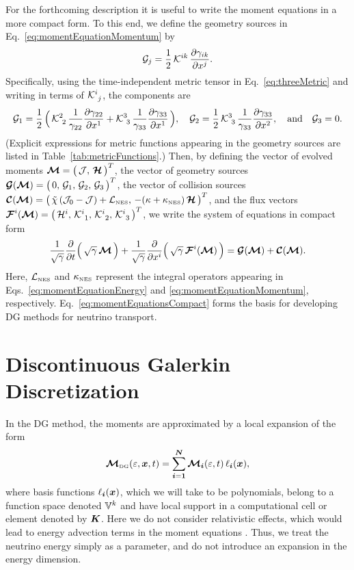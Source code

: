 \documentclass[10pt,preprint]{aastex}
\newcommand{\NES}{\mbox{\tiny NES}}
\begin{document}
For the forthcoming description it is useful to write the moment equations in a more compact form.  
To this end, we define the geometry sources in Eq.~\eqref{eq:momentEquationMomentum} by
\begin{equation}
  \mathcal{G}_{j}
  =\frac{1}{2}\,\mathcal{K}^{ik}\,\frac{\partial \gamma_{ik}}{\partial x^{j}}.  
\end{equation}
Specifically, using the time-independent metric tensor in Eq.~\eqref{eq:threeMetric} and writing in terms of $\mathcal{K}^{i}_{~j}$, the components are
\begin{equation}
  \mathcal{G}_{1}
  =\frac{1}{2}\,\Big(\,\mathcal{K}^{2}_{~2}\,\frac{1}{\gamma_{22}}\frac{\partial \gamma_{22}}{\partial x^{1}}+\mathcal{K}^{3}_{~3}\,\frac{1}{\gamma_{33}}\frac{\partial \gamma_{33}}{\partial x^{1}}\,\Big), \quad
  \mathcal{G}_{2}
  =\frac{1}{2}\,\mathcal{K}^{3}_{~3}\,\frac{1}{\gamma_{33}}\frac{\partial \gamma_{33}}{\partial x^{2}}, \quad\text{and}\quad
  \mathcal{G}_{3}
  =0.
\end{equation}
(Explicit expressions for metric functions appearing in the geometry sources are listed in Table~\ref{tab:metricFunctions}.)  
Then, by defining the vector of evolved moments $\boldsymbol{\mathcal{M}}=\big(\,\mathcal{J},\,\boldsymbol{\mathcal{H}}\,\big)^{T}$, the vector of geometry sources $\boldsymbol{\mathcal{G}}(\boldsymbol{\mathcal{M}})=\big(\,0,\,\mathcal{G}_{1},\,\mathcal{G}_{2},\,\mathcal{G}_{3}\,\big)^{T}$, the vector of collision sources $\bcC(\bcM)=\big(\,\tilde{\chi}\,(\cJ_{0}-\cJ)+\cL_{\NES},\,-(\kappa+\kappa_{\NES})\,\bcH\,\big)^{T}$, and the flux vectors $\boldsymbol{\mathcal{F}}^{i}(\boldsymbol{\mathcal{M}})=\big(\,\mathcal{H}^{i},\,\mathcal{K}_{~1}^{i},\,\mathcal{K}_{~2}^{i},\,\mathcal{K}_{~3}^{i}\,\big)^{T}$, we write the system of equations in compact form
\begin{equation}
  \frac{1}{\sqrt{\gamma}}\frac{\partial }{\partial t}\Big(\,\sqrt{\gamma}\,\boldsymbol{\mathcal{M}}\,\Big)
  +\frac{1}{\sqrt{\gamma}}\frac{\partial }{\partial x^{i}}\Big(\,\sqrt{\gamma}\,\boldsymbol{\mathcal{F}}^{i}(\boldsymbol{\mathcal{M}})\,\Big)
  =\boldsymbol{\mathcal{G}}(\boldsymbol{\mathcal{M}})+\boldsymbol{\mathcal{C}}(\boldsymbol{\mathcal{M}}).
  \label{eq:momentEquationsCompact}
\end{equation}
Here, $\cL_{\NES}$ and $\kappa_{\NES}$ represent the integral operators appearing in Eqs.~\eqref{eq:momentEquationEnergy} and \eqref{eq:momentEquationMomentum}, respectively.  
Eq.~\eqref{eq:momentEquationsCompact} forms the basis for developing DG methods for neutrino transport.  

\section{Discontinuous Galerkin Discretization}

In the DG method, the moments are approximated by a local expansion of the form
\begin{equation}
  \boldsymbol{\mathcal{M}}_{\mbox{\tiny DG}}(\varepsilon,\boldsymbol{x},t)
  =\sum_{\boldsymbol{i}=\boldsymbol{1}}^{\boldsymbol{N}}\boldsymbol{\mathcal{M}}_{\boldsymbol{i}}(\varepsilon,t)\,\ell_{\boldsymbol{i}}(\boldsymbol{x}), 
\end{equation}
where basis functions $\ell_{\boldsymbol{i}}(\boldsymbol{x})$, which we will take to be polynomials, belong to a function space denoted $\mathbb{V}^{k}$ and have local support in a computational cell or element denoted by $\boldsymbol{K}$.  
Here we do not consider relativistic effects, which would lead to energy advection terms in the moment equations \citep[cf.][]{cardall_etal_2013a}.  
Thus, we treat the neutrino energy simply as a parameter, and do not introduce an expansion in the energy dimension.  
\end{document}
